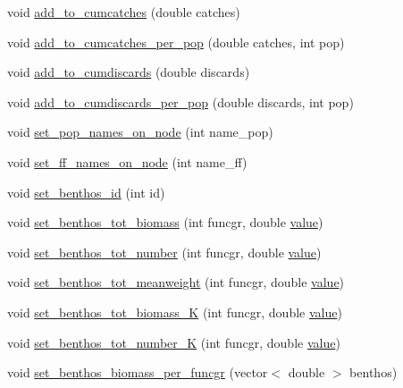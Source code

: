 \begin{DoxyCompactItemize}
\item 
void \mbox{\hyperlink{class_node_acdf79413c8c5ec3a10e3f7f0a3dcc6c3}{add\+\_\+to\+\_\+cumcatches}} (double catches)
\item 
void \mbox{\hyperlink{class_node_a4e48667023f2c73bb363898c9a508292}{add\+\_\+to\+\_\+cumcatches\+\_\+per\+\_\+pop}} (double catches, int pop)
\item 
void \mbox{\hyperlink{class_node_a2b0502c38e35ceebb3d66369f9c1108b}{add\+\_\+to\+\_\+cumdiscards}} (double discards)
\item 
void \mbox{\hyperlink{class_node_aa0c85fff80790f92aec1ed711ff73456}{add\+\_\+to\+\_\+cumdiscards\+\_\+per\+\_\+pop}} (double discards, int pop)
\item 
void \mbox{\hyperlink{class_node_adf65aa34ec944d78e64ca64bc433a45b}{set\+\_\+pop\+\_\+names\+\_\+on\+\_\+node}} (int name\+\_\+pop)
\item 
void \mbox{\hyperlink{class_node_a4b7891f21f59337e44b3ab9eb2fe2aaa}{set\+\_\+ff\+\_\+names\+\_\+on\+\_\+node}} (int name\+\_\+ff)
\item 
void \mbox{\hyperlink{class_node_a0eeffd50a8278822d7fd2fe8c8aeeede}{set\+\_\+benthos\+\_\+id}} (int id)
\item 
void \mbox{\hyperlink{class_node_ad4c8e255fd758deeaff3c2ad32a28628}{set\+\_\+benthos\+\_\+tot\+\_\+biomass}} (int funcgr, double \mbox{\hyperlink{diffusion_8cpp_a4b41795815d9f3d03abfc739e666d5da}{value}})
\item 
void \mbox{\hyperlink{class_node_a53a1d3a77bb3265769b7c5763072acb8}{set\+\_\+benthos\+\_\+tot\+\_\+number}} (int funcgr, double \mbox{\hyperlink{diffusion_8cpp_a4b41795815d9f3d03abfc739e666d5da}{value}})
\item 
void \mbox{\hyperlink{class_node_aec5dd8fca0a4b8773dc2565dc7419446}{set\+\_\+benthos\+\_\+tot\+\_\+meanweight}} (int funcgr, double \mbox{\hyperlink{diffusion_8cpp_a4b41795815d9f3d03abfc739e666d5da}{value}})
\item 
void \mbox{\hyperlink{class_node_a4308ef8f4fb443d6ddc7523769d5bb5e}{set\+\_\+benthos\+\_\+tot\+\_\+biomass\+\_\+K}} (int funcgr, double \mbox{\hyperlink{diffusion_8cpp_a4b41795815d9f3d03abfc739e666d5da}{value}})
\item 
void \mbox{\hyperlink{class_node_a41efe644c64b5a04a2077dbc57e7f45c}{set\+\_\+benthos\+\_\+tot\+\_\+number\+\_\+K}} (int funcgr, double \mbox{\hyperlink{diffusion_8cpp_a4b41795815d9f3d03abfc739e666d5da}{value}})
\item 
void \mbox{\hyperlink{class_node_a949054e59f4651d1b724147c23882b90}{set\+\_\+benthos\+\_\+biomass\+\_\+per\+\_\+funcgr}} (vector$<$ double $>$ benthos)

\end{DoxyCompactItemize}
